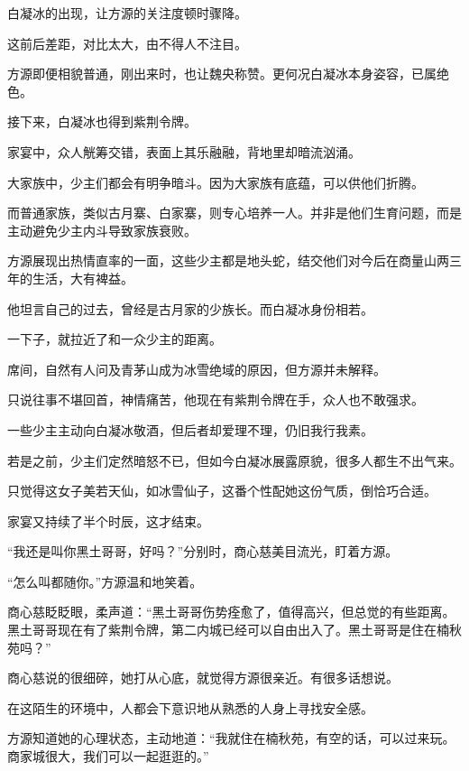
\begin{this_body}



白凝冰的出现，让方源的关注度顿时骤降。

这前后差距，对比太大，由不得人不注目。

方源即便相貌普通，刚出来时，也让魏央称赞。更何况白凝冰本身姿容，已属绝色。

接下来，白凝冰也得到紫荆令牌。

家宴中，众人觥筹交错，表面上其乐融融，背地里却暗流汹涌。

大家族中，少主们都会有明争暗斗。因为大家族有底蕴，可以供他们折腾。

而普通家族，类似古月寨、白家寨，则专心培养一人。并非是他们生育问题，而是主动避免少主内斗导致家族衰败。

方源展现出热情直率的一面，这些少主都是地头蛇，结交他们对今后在商量山两三年的生活，大有裨益。

他坦言自己的过去，曾经是古月家的少族长。而白凝冰身份相若。

一下子，就拉近了和一众少主的距离。

席间，自然有人问及青茅山成为冰雪绝域的原因，但方源并未解释。

只说往事不堪回首，神情痛苦，他现在有紫荆令牌在手，众人也不敢强求。

一些少主主动向白凝冰敬酒，但后者却爱理不理，仍旧我行我素。

若是之前，少主们定然暗怒不已，但如今白凝冰展露原貌，很多人都生不出气来。

只觉得这女子美若天仙，如冰雪仙子，这番个性配她这份气质，倒恰巧合适。

家宴又持续了半个时辰，这才结束。

“我还是叫你黑土哥哥，好吗？”分别时，商心慈美目流光，盯着方源。

“怎么叫都随你。”方源温和地笑着。

商心慈眨眨眼，柔声道：“黑土哥哥伤势痊愈了，值得高兴，但总觉的有些距离。黑土哥哥现在有了紫荆令牌，第二内城已经可以自由出入了。黑土哥哥是住在楠秋苑吗？”

商心慈说的很细碎，她打从心底，就觉得方源很亲近。有很多话想说。

在这陌生的环境中，人都会下意识地从熟悉的人身上寻找安全感。

方源知道她的心理状态，主动地道：“我就住在楠秋苑，有空的话，可以过来玩。商家城很大，我们可以一起逛逛的。”


\end{this_body}
